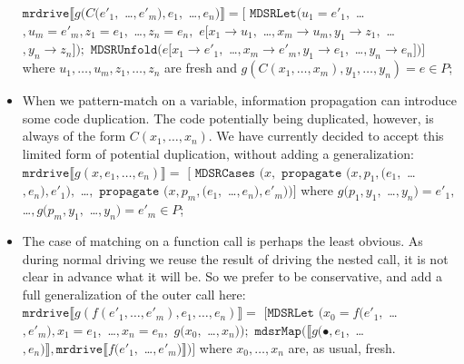 \documentclass[submission,copyright,creativecommons]{eptcs}
\begin{document}
\begin{itemize}
    $\mathtt{mrdrive} \llbracket g(C(e'_1,$ \ldots$, e'_m), e_1,$ \ldots$, e_n) \rrbracket = [$
    $\mathtt{MDSRLet}(u_1=e'_1,$ \ldots$, u_m=e'_m, z_1=e_1,$ \ldots$, z_n=e_n,$ 
      $e [ x_1\rightarrow u_1,$ \ldots$, x_m\rightarrow u_m, y_1 \rightarrow z_1,$ \ldots$, y_n \rightarrow z_n ]);$ 
    $\mathtt{MDSRUnfold}(e [ x_1\rightarrow e'_1,$ \ldots$, x_m\rightarrow e'_m, y_1 \rightarrow e_1,$ \ldots$, y_n \rightarrow e_n ])]$
    where $u_1, \ldots, u_m, z_1, \ldots, z_n$ are fresh and $g(C(x_1, \ldots, x_m), y_1, \ldots, y_n) = e \in P$;
  \item When we pattern-match on a variable, information propagation can introduce some code duplication. 
    The code potentially being duplicated, however, is always of the form $C(x_1, \ldots, x_n)$.
    We have currently decided to accept this limited form of potential duplication, without adding a generalization: \\
    $\mathtt{mrdrive} \llbracket g(x, e_1, \ldots, e_n) \rrbracket =$
    $[$ $\mathtt{MDSRCases}$ $(x,$ $\mathtt{propagate}$ $(x, p_1, (e_1,$ \ldots$, e_n), e'_1),$ \ldots$,$ 
    $\mathtt{propagate}$ $(x, p_m, (e_1,$ \ldots$, e_n), e'_m))]$
    where $g(p_1, y_1,$ \ldots$, y_n) = e'_1,$ \ldots$, g(p_m, y_1,$ \ldots$, y_n) = e'_m \in P$;
  \item The case of matching on a function call is perhaps the least obvious. 
    As during normal driving we reuse the result of driving the nested call, it is not clear in advance what
    it will be.
    So we prefer to be conservative, and add a full generalization of the outer call here: \\
    $\mathtt{mrdrive} \llbracket g(f(e'_1, \ldots, e'_m), e_1, \ldots, e_n) \rrbracket =$
    $[\mathtt{MDSRLet}$ $(x_0=f(e'_1,$ \ldots$, e'_m), x_1=e_1,$ \ldots$, x_n=e_n,$ 
    $g(x_0,$ \ldots$, x_n));$ 
    $\mathtt{mdsrMap}(\llbracket g(\bullet, e_1,$ \ldots$, e_n) \rrbracket, \mathtt{mrdrive} \llbracket f(e'_1,$ \ldots$, e'_m) \rrbracket)]$
    where $x_0, \ldots, x_n$ are, as usual, fresh.
\end{itemize}
\end{document}
